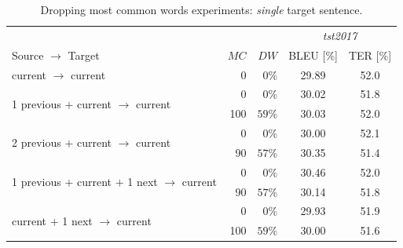 \documentclass[11pt, a4paper, landscape]{article}
\begin{document}
\NewPage
\vfill
\begin{table}
  \small
  \bf
  \caption{Dropping most common words experiments: \emph{single} target sentence.}
  \begin{center}
    \begin{tabular}{l|rr||cc}
      && & \multicolumn{2}{c}{\textit{tst2017}} \\
      \phantom{1 previous $+$ }Source\phantom{ $+$ 1 next} $\to$ Target & $MC$ & $DW$ & BLEU [$\%$] & TER [$\%$] \\
      \toprule
      \toprule
      \phantom{1 previous $+$ }current\phantom{ $+$ 1 next} $\to$ current & 0 & $0\%$ & 29.89 & 52.0 \\
      \midrule
      \multirow{2}{*}{1 previous $+$ current\phantom{ $+$ 1 next} $\to$ current} &0 & $0\%$ & 30.02 & \alert{51.8} \\
      & 100 & $59\%$ & \alert{30.03} & 52.0 \\
      \midrule
      \multirow{2}{*}{2 previous $+$ current\phantom{ $+$ 1 next} $\to$ current} & 0 & $0\%$ & 30.00 & 52.1 \\
      & 90 & $57\%$ & \alert{30.35} & \alert{51.4} \\
      \midrule
      \multirow{2}{*}{1 previous $+$ current $+$ 1 next $\to$ current} & 0& $0\%$ & \alert{30.46} & 52.0 \\
      & 90 & $57\%$ & 30.14 & \alert{51.8} \\
      \midrule
      \multirow{2}{*}{\phantom{ $+$ 1 previous}current $+$ 1 next $\to$ current} & 0 & $0\%$ & 29.93 & 51.9 \\
      &100 & $59\%$& \alert{30.00} & \alert{51.6}
    \end{tabular}
  \end{center}
\end{table}
\vfill
\end{document}
